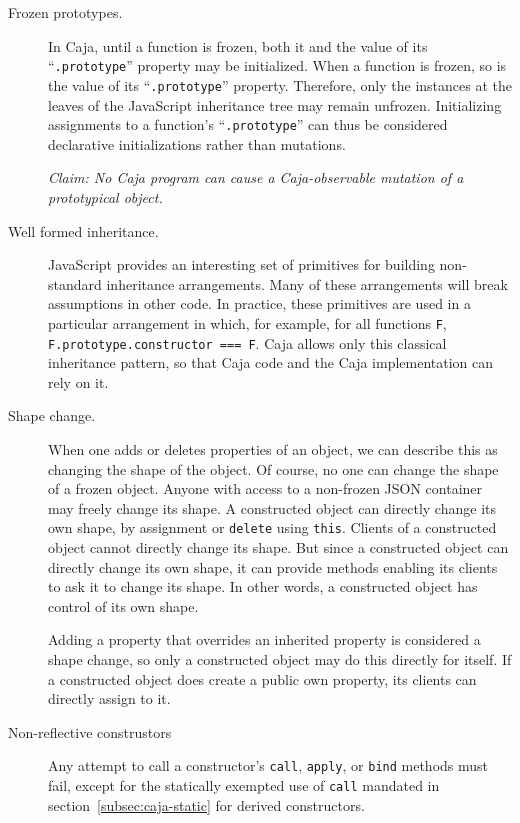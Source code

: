 \documentclass[letterpaper,twocolumn,10pt]{article}
\newcommand{\code}[1]{{\tt {#1}}}              %
\begin{document}
\begin{description}

  \item[Frozen prototypes.] In Caja, until a function is frozen, both it and 
  the value of its ``\code{.prototype}'' property may be initialized. When a 
  function is frozen, so is the value of its ``\code{.prototype}'' property. 
  Therefore, only the instances at the leaves of the JavaScript inheritance 
  tree may remain unfrozen. Initializing 
  assignments to a function's ``\code{.prototype}'' can thus be considered declarative initializations rather than 
  mutations.
  
  \emph{Claim: No Caja program can cause a Caja-observable mutation of a 
  prototypical object.}
  
   \item[Well formed inheritance.] JavaScript provides an interesting set of 
   primitives for building non-standard inheritance arrangements. Many of 
   these arrangements will break assumptions in other code. In practice, 
   these primitives are used in a particular arrangement in which, for 
   example, for all functions \code{F}, \code{F.prototype.constructor === F}. 
   Caja allows only this classical inheritance pattern, so that Caja code and 
   the Caja implementation can rely on it.
   
   \item[Shape change.] When one adds or deletes properties of an object, we 
   can describe this as changing the shape of the object. Of course, no one 
   can change the shape of a frozen object. Anyone with access to a 
   non-frozen JSON container may freely change its shape. A constructed 
   object can directly change its own shape, by assignment or \code{delete} 
   using \code{this}. Clients of a constructed object cannot directly change 
   its shape. But since a constructed object can directly change its own 
   shape, it can provide methods enabling its clients to ask it to change its 
   shape. In other words, a constructed object has control of its own shape.
   
   Adding a property that overrides an inherited property is considered a 
   shape change, so only a constructed object may do this directly for 
   itself. If a constructed object does create a public own property, its 
   clients can directly assign to it.
   
   \item[Non-reflective construstors] Any attempt to call a constructor's 
   \code{call}, \code{apply}, or \code{bind} methods must fail, except for 
   the statically exempted use of \code{call} mandated in section~\ref{subsec:caja-static} for derived 
   constructors.
   

\end{description}
\end{document}
